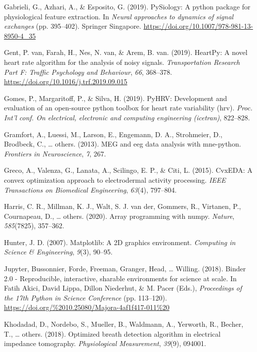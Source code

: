 \documentclass[
  english,
  man,floatsintext]{apa6}
\begin{document}
\leavevmode\hypertarget{ref-PySiology}{}%
Gabrieli, G., Azhari, A., \& Esposito, G. (2019). PySiology: A python package for physiological feature extraction. In \emph{Neural approaches to dynamics of signal exchanges} (pp. 395--402). Springer Singapore. \url{https://doi.org/10.1007/978-981-13-8950-4_35}

\leavevmode\hypertarget{ref-HeartPy}{}%
Gent, P. van, Farah, H., Nes, N. van, \& Arem, B. van. (2019). HeartPy: A novel heart rate algorithm for the analysis of noisy signals. \emph{Transportation Research Part F: Traffic Psychology and Behaviour}, \emph{66}, 368--378. \url{https://doi.org/10.1016/j.trf.2019.09.015}

\leavevmode\hypertarget{ref-gomes2019pyhrv}{}%
Gomes, P., Margaritoff, P., \& Silva, H. (2019). PyHRV: Development and evaluation of an open-source python toolbox for heart rate variability (hrv). \emph{Proc. Int'l conf. On electrical, electronic and computing engineering (icetran)}, 822--828.

\leavevmode\hypertarget{ref-gramfort2013meg}{}%
Gramfort, A., Luessi, M., Larson, E., Engemann, D. A., Strohmeier, D., Brodbeck, C., \ldots{} others. (2013). MEG and eeg data analysis with mne-python. \emph{Frontiers in Neuroscience}, \emph{7}, 267.

\leavevmode\hypertarget{ref-greco2015cvxeda}{}%
Greco, A., Valenza, G., Lanata, A., Scilingo, E. P., \& Citi, L. (2015). CvxEDA: A convex optimization approach to electrodermal activity processing. \emph{IEEE Transactions on Biomedical Engineering}, \emph{63}(4), 797--804.

\leavevmode\hypertarget{ref-harris2020array}{}%
Harris, C. R., Millman, K. J., Walt, S. J. van der, Gommers, R., Virtanen, P., Cournapeau, D., \ldots{} others. (2020). Array programming with numpy. \emph{Nature}, \emph{585}(7825), 357--362.

\leavevmode\hypertarget{ref-matplotlib}{}%
Hunter, J. D. (2007). Matplotlib: A 2D graphics environment. \emph{Computing in Science \& Engineering}, \emph{9}(3), 90--95.

\leavevmode\hypertarget{ref-Jupyter2018}{}%
Jupyter, Bussonnier, Forde, Freeman, Granger, Head, \ldots{} Willing. (2018). Binder 2.0 - Reproducible, interactive, sharable environments for science at scale. In Fatih Akici, David Lippa, Dillon Niederhut, \& M. Pacer (Eds.), \emph{Proceedings of the 17th Python in Science Conference} (pp. 113--120). \url{https://doi.org/\%2010.25080/Majora-4af1f417-011\%20}

\leavevmode\hypertarget{ref-khodadad2018optimized}{}%
Khodadad, D., Nordebo, S., Mueller, B., Waldmann, A., Yerworth, R., Becher, T., \ldots{} others. (2018). Optimized breath detection algorithm in electrical impedance tomography. \emph{Physiological Measurement}, \emph{39}(9), 094001.
\end{document}

